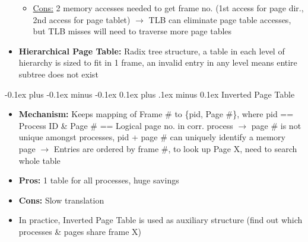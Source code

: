 \documentclass[landscape]{article}
\makeatletter
\renewcommand{\subsection}{\@startsection{subsection}{2}{0mm}%
  {-0.1ex plus -0.1ex minus -0.1ex}%
  {0.1ex plus .1ex minus 0.1ex}%
{\normalfont\scriptsize\bfseries}}
\makeatother
\begin{document}
\begin{multicols*}{6}
\begin{itemize}
\begin{itemize}
        \item \underline{Cons:} 2 memory accesses needed to get frame no. (1st access for page dir., 2nd access for page tablet) $\rightarrow$ TLB can eliminate page table accesses, but TLB misses will need to traverse more page tables
      \end{itemize}
      \item \textbf{Hierarchical Page Table:} Radix tree structure, a table in each level of hierarchy is sized to fit in 1 frame, an invalid entry in any level means entire subtree does not exist
    \end{itemize}

    \subsection{Inverted Page Table}
    \begin{itemize}
      \item \textbf{Mechanism:} Keeps mapping of Frame \# to \{pid, Page \#\}, where pid == Process ID \& Page \# == Logical page no. in corr. process $\rightarrow$ page \# is not unique amongst processes, pid + page \# can uniquely identify a memory page $\rightarrow$ Entries are ordered by frame \#, to look up Page X, need to search whole table
      \item \textbf{Pros:} 1 table for all processes, huge savings
      \item \textbf{Cons:} Slow translation
      \item In practice, Inverted Page Table is used as auxiliary structure (find out which processes \& pages share frame X)
    \end{itemize}


\end{multicols*}
\end{document}
